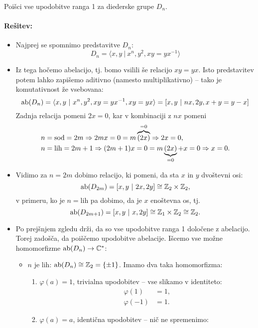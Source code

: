 \begin{zgled}
	Poi\v sci vse upodobitve ranga 1 za diederske grupe $D_n$.

	\paragraph{Re\v sitev:}
	\begin{itemize}
		\item{Najprej se spomnimo predstavitve $D_n$:
			\[
				D_n = \langle x, y\ |\ x^n, y^2, xy = yx^{-1} \rangle
			\]}
		\item{Iz tega ho\v cemo abelacijo, tj. bomo vsilili \v se relacijo $xy = yx$. Isto predstavitev potem lahko
			zapi\v semo aditivno (namesto multiplikativno) -- tako je komutativnost \v ze vsebovana:
			\[
				\operatorname{ab} (D_n) = \langle x, y\ |\ x^n, y^2, xy = yx^{-1}, xy = yx \rangle =
					[x, y\ |\ nx, 2y, x + y = y - x]
			\]
			\ni  Zadnja relacija pomeni $2x = 0$, kar v kombinaciji z $nx$ pomeni
			\begin{align*}
				n &=\text{sod} = 2m \Rightarrow 2m x = 0 = m \overbrace{(2x)}^{= 0} \Rightarrow 2x = 0, \\
				n &=\text{lih} = 2m + 1 \Rightarrow (2m + 1)x = 0 = m\underbrace{(2x)}_{= 0} + x = 0 \Rightarrow x = 0.
			\end{align*}}
		\item{Vidimo za $n = 2m$ dobimo relacijo, ki pomeni, da sta $x$ in $y$ dvo\v stevni osi:
			\[
				\operatorname{ab}(D_{2m}) = [x, y\ |\ 2x, 2y] \cong \mathbb{Z}_2 \times \mathbb{Z}_2,
			\]
			v primeru, ko je $n = \text{lih}$ pa dobimo, da je $x$ eno\v stevna os, tj.
			\[
				\ab(D_{2m+1}) = [x, y\ |\ x, 2y] \cong \Z_1 \times \Z_2 \cong \Z_2.
			\]}
		\item{Po prej\v snjem zgledu dr\v zi, da so vse upodobitve ranga 1 dolo\v cene z abelacijo. Torej zado\v s\v ca,
			da poi\v s\v cemo upodobitve abelacije. I\v scemo vse mo\v zne homomorfizme $\operatorname{ab}(D_n) \to \mathbb{C}^*$:
			\begin{itemize}
				\item{$n$ je lih: $\operatorname{ab}(D_n) \cong \mathbb{Z}_2 = \{\pm 1\}$. Imamo dva taka homomorfizma:
					\begin{enumerate}
						\item{$\varphi(a) = 1$, trivialna upodobitev -- vse slikamo v identiteto:
							\begin{align*}
								\varphi(1) &= 1, \\
								\varphi(-1) &= 1.
							\end{align*}}
						\item{$\varphi(a) = a$, identi\v cna upodobitev -- ni\v c ne spremenimo:
}
\end{enumerate}}
\end{itemize}}
\end{itemize}
\end{zgled}

